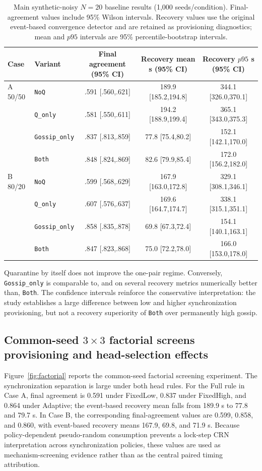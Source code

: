 \documentclass[11pt]{article}
\begin{document}
\begin{table}[H]
\centering
\caption{Main synthetic-noisy $N=20$ baseline results (1,000 seeds/condition). Final-agreement values include 95\% Wilson intervals. Recovery values use the original event-based convergence detector and are retained as provisioning diagnostics; mean and $p95$ intervals are 95\% percentile-bootstrap intervals.}
\label{tab:main-noisy}
\scriptsize
\begin{tabular}{llccc}
\toprule
Case & Variant & Final agreement (95\% CI) & Recovery mean s (95\% CI) & Recovery $p95$ s (95\% CI)\\
\midrule
A 50/50 & \texttt{NoQ} & .591 [.560,.621] & 189.9 [185.2,194.8] & 344.1 [326.0,370.1]\\
& \texttt{Q\_only} & .581 [.550,.611] & 194.2 [188.9,199.4] & 365.1 [343.0,375.3]\\
& \texttt{Gossip\_only} & .837 [.813,.859] & 77.8 [75.4,80.2] & 152.1 [142.1,170.0]\\
& \texttt{Both} & .848 [.824,.869] & 82.6 [79.9,85.4] & 172.0 [156.2,182.0]\\
\midrule
B 80/20 & \texttt{NoQ} & .599 [.568,.629] & 167.9 [163.0,172.8] & 329.1 [308.1,346.1]\\
& \texttt{Q\_only} & .607 [.576,.637] & 169.6 [164.7,174.7] & 338.1 [315.1,351.1]\\
& \texttt{Gossip\_only} & .858 [.835,.878] & 69.8 [67.3,72.4] & 154.1 [140.1,163.1]\\
& \texttt{Both} & .847 [.823,.868] & 75.0 [72.2,78.0] & 166.0 [153.0,178.0]\\
\bottomrule
\end{tabular}
\end{table}

Quarantine by itself does not improve the one-pair regime. Conversely, \texttt{Gossip\_only} is comparable to, and on several recovery metrics numerically better than, \texttt{Both}. The confidence intervals reinforce the conservative interpretation: the study establishes a large difference between low and higher synchronization provisioning, but not a recovery superiority of \texttt{Both} over permanently high gossip.

\subsection{Common-seed \texorpdfstring{$3\times3$}{3x3} factorial screens provisioning and head-selection effects}
Figure~\ref{fig:factorial} reports the common-seed factorial screening experiment. The synchronization separation is large under both head rules. For the Full rule in Case A, final agreement is 0.591 under FixedLow, 0.837 under FixedHigh, and 0.864 under Adaptive; the event-based recovery mean falls from 189.9 s to 77.8 and 79.7 s. In Case B, the corresponding final-agreement values are 0.599, 0.858, and 0.860, with event-based recovery means 167.9, 69.8, and 71.9 s. Because policy-dependent pseudo-random consumption prevents a lock-step CRN interpretation across synchronization policies, these values are used as mechanism-screening evidence rather than as the central paired timing attribution.
\end{document}
